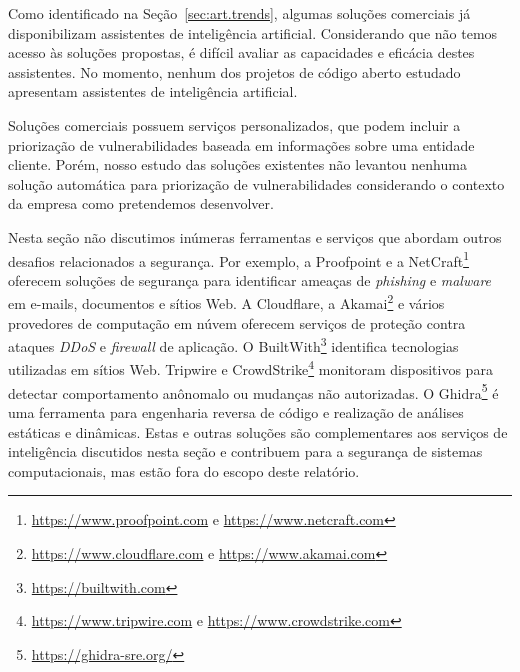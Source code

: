 \begin{description}
    Como identificado na Seção~\ref{sec:art.trends}, algumas soluções comerciais já disponibilizam assistentes de inteligência artificial. Considerando que não temos acesso às soluções propostas, é difícil avaliar as capacidades e eficácia destes assistentes. No momento, nenhum dos projetos de código aberto estudado apresentam assistentes de inteligência artificial.

    Soluções comerciais possuem serviços personalizados, que podem incluir a priorização de vulnerabilidades baseada em informações sobre uma entidade cliente. Porém, nosso estudo das soluções existentes não levantou nenhuma solução automática para priorização de vulnerabilidades considerando o contexto da empresa como pretendemos desenvolver.

\end{description}

Nesta seção não discutimos inúmeras ferramentas e serviços que abordam outros desafios relacionados a segurança. Por exemplo, a Proofpoint e a NetCraft\footnote{\url{https://www.proofpoint.com} e \url{https://www.netcraft.com}} oferecem soluções de segurança para identificar ameaças de \emph{phishing} e \emph{malware} em e-mails, documentos e sítios Web. A Cloudflare, a Akamai\footnote{\url{https://www.cloudflare.com} e \url{https://www.akamai.com}} e vários provedores de computação em núvem oferecem serviços de proteção contra ataques \emph{DDoS} e \emph{firewall} de aplicação. O BuiltWith\footnote{\url{https://builtwith.com}} identifica tecnologias utilizadas em sítios Web. Tripwire e CrowdStrike\footnote{\url{https://www.tripwire.com} e \url{https://www.crowdstrike.com}} monitoram dispositivos para detectar comportamento anônomalo ou mudanças não autorizadas. O Ghidra\footnote{\url{https://ghidra-sre.org/}} é uma ferramenta para engenharia reversa de código e realização de análises estáticas e dinâmicas. Estas e outras soluções são complementares aos serviços de inteligência discutidos nesta seção e contribuem para a segurança de sistemas computacionais, mas estão fora do escopo deste relatório.
